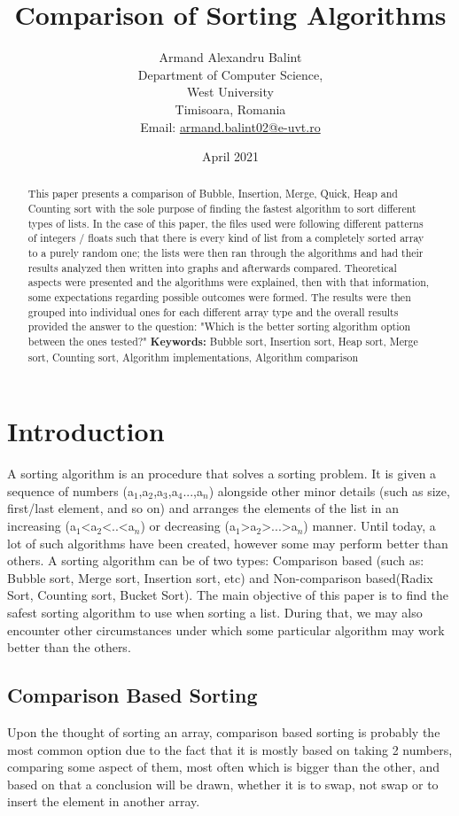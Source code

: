 \documentclass{article}
\title{Comparison of Sorting Algorithms}
\author{Armand Alexandru Balint\\
Department of Computer Science,\\
West University\\
Timisoara, Romania\\
Email: \href{mailto:armand.balint02@e-uvt.ro}{armand.balint02@e-uvt.ro}}
\date{April 2021}
\begin{document}
\maketitle
\begin{abstract}
This paper presents a comparison of Bubble, Insertion, Merge, Quick, Heap and Counting sort with the sole purpose of finding the fastest algorithm to sort different types of lists. In the case of this paper, the files used were following different patterns of integers / floats such that there is every kind of list from a completely sorted array to a purely random one; the lists were then ran through the algorithms and had their results analyzed then written into graphs and afterwards compared. Theoretical aspects were presented and the algorithms were explained, then with that information, some expectations regarding possible outcomes were formed. The results were then grouped into individual ones for each different array type and the overall results provided the answer to the question: "Which is the better sorting algorithm option between the ones tested?" \newline \newline \textbf{Keywords:} \footnotesize Bubble sort, Insertion sort, Heap sort, Merge sort, Counting sort, Algorithm implementations, Algorithm comparison


\end{abstract}
\normalsize
\clearpage
\clearpage

\section{Introduction}
A sorting algorithm is an procedure that solves a sorting problem. It is given a sequence of numbers (a$_1$,a$_2$,a$_3$,a$_4$...,a$_n$) alongside other minor details (such as size, first/last element, and so on) and arranges the elements of the list in an increasing (a$_1$<a$_2$<..<a$_n$) or decreasing (a$_1$>a$_2$>...>a$_n$) manner. Until today, a lot of such algorithms have been created, however some may perform better than others. A sorting algorithm can be of two types: Comparison based (such as: Bubble sort, Merge sort, Insertion sort, etc) and Non-comparison based(Radix Sort, Counting sort, Bucket Sort). The main objective of this paper is to find the safest sorting algorithm to use when sorting a list. During that, we may also encounter other circumstances under which some particular algorithm may work better than the others.

\subsection{Comparison Based Sorting}
Upon the thought of sorting an array, comparison based sorting is probably the most common option due to the fact that it is mostly based on taking 2 numbers, comparing some aspect of them, most often which is bigger than the other, and based on that a conclusion will be drawn, whether it is to swap, not swap or to insert the element in another array.
\end{document}
